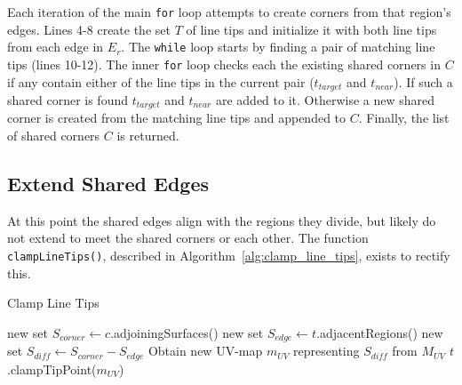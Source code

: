Each iteration of the main \verb|for| loop attempts to create corners from that region's edges.
Lines 4-8 create the set $T$ of line tips and initialize it with both line tips from each edge in $E_r$.
The \verb|while| loop starts by finding a pair of matching line tips (lines 10-12).
The inner \verb|for| loop checks each the existing shared corners in $C$ if any contain either of the line tips in the current pair ($t_{target}$ and $t_{near}$).
If such a shared corner is found $t_{target}$ and $t_{near}$ are added to it.
Otherwise a new shared corner is created from the matching line tips and appended to $C$.
Finally, the list of shared corners $C$ is returned.

\subsection{Extend Shared Edges}\label{sec:extend_shared_edges}
At this point the shared edges align with the regions they divide, but likely do not extend to meet the shared corners or each other.
The function \verb|clampLineTips()|, described in Algorithm~\ref{alg:clamp_line_tips}, exists to rectify this.

\begin{algorithm}[htb]
\caption{Clamp Line Tips}\label{alg:clamp_line_tips}
\begin{algorithmic}[1]
		\State new set $S_{corner} \leftarrow c$.adjoiningSurfaces() 
			\State new set $S_{edge} \leftarrow t$.adjacentRegions() %
			\State new set $S_{diff} \leftarrow S_{corner} - S_{edge}$ 
			\State Obtain new UV-map $m_{UV}$ representing $S_{diff}$ from $M_{UV}$
			\State $t$.clampTipPoint($m_{UV}$)\label{alg:clamp_tip_point}
		\EndFor
	\EndFor
\EndFunction
\end{algorithmic}
\end{algorithm}

